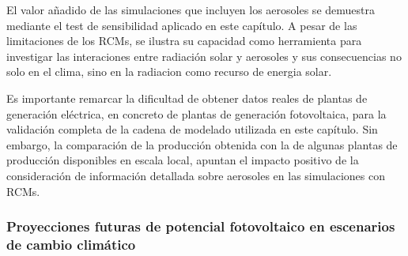 El valor añadido de las simulaciones que incluyen los aerosoles se demuestra mediante el test de sensibilidad aplicado en este capítulo. A pesar de las limitaciones de los RCMs, se ilustra su capacidad como herramienta para investigar las interaciones entre radiación solar y aerosoles y sus consecuencias no solo en el clima, sino en la radiacion como recurso de energia solar.


Es importante remarcar la dificultad de obtener datos reales de plantas de generación eléctrica, en concreto de plantas de generación fotovoltaica, para la validación completa de la cadena de modelado utilizada en este capítulo. Sin embargo, la comparación de la producción obtenida con la de algunas plantas de producción disponibles en escala local, apuntan el impacto positivo de la consideración de información detallada sobre aerosoles en las simulaciones con RCMs. 




\subsubsection{Proyecciones futuras de potencial fotovoltaico en escenarios de cambio climático}

